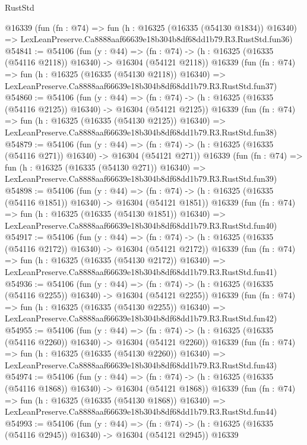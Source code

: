 \begin{lexlean}{RustStd}
\begin{coremodule}
    @16339
    (fun (fn : @74) =>
    fun (h : @16325 (@16335 (@54130 @1834)) @16340) =>
    LexLeanPreserve.Ca8888aaf66639e18b304b8df68dd1b79.R3.RustStd.fun36)
@54841 := @54106
    (fun (y : @44) =>
    (fn : @74) -> (h : @16325 (@16335 (@54116 @2118)) @16340) -> @16304 (@54121 @2118))
    @16339
    (fun (fn : @74) =>
    fun (h : @16325 (@16335 (@54130 @2118)) @16340) =>
    LexLeanPreserve.Ca8888aaf66639e18b304b8df68dd1b79.R3.RustStd.fun37)
@54860 := @54106
    (fun (y : @44) =>
    (fn : @74) -> (h : @16325 (@16335 (@54116 @2125)) @16340) -> @16304 (@54121 @2125))
    @16339
    (fun (fn : @74) =>
    fun (h : @16325 (@16335 (@54130 @2125)) @16340) =>
    LexLeanPreserve.Ca8888aaf66639e18b304b8df68dd1b79.R3.RustStd.fun38)
@54879 := @54106
    (fun (y : @44) =>
    (fn : @74) -> (h : @16325 (@16335 (@54116 @271)) @16340) -> @16304 (@54121 @271))
    @16339
    (fun (fn : @74) =>
    fun (h : @16325 (@16335 (@54130 @271)) @16340) =>
    LexLeanPreserve.Ca8888aaf66639e18b304b8df68dd1b79.R3.RustStd.fun39)
@54898 := @54106
    (fun (y : @44) =>
    (fn : @74) -> (h : @16325 (@16335 (@54116 @1851)) @16340) -> @16304 (@54121 @1851))
    @16339
    (fun (fn : @74) =>
    fun (h : @16325 (@16335 (@54130 @1851)) @16340) =>
    LexLeanPreserve.Ca8888aaf66639e18b304b8df68dd1b79.R3.RustStd.fun40)
@54917 := @54106
    (fun (y : @44) =>
    (fn : @74) -> (h : @16325 (@16335 (@54116 @2172)) @16340) -> @16304 (@54121 @2172))
    @16339
    (fun (fn : @74) =>
    fun (h : @16325 (@16335 (@54130 @2172)) @16340) =>
    LexLeanPreserve.Ca8888aaf66639e18b304b8df68dd1b79.R3.RustStd.fun41)
@54936 := @54106
    (fun (y : @44) =>
    (fn : @74) -> (h : @16325 (@16335 (@54116 @2255)) @16340) -> @16304 (@54121 @2255))
    @16339
    (fun (fn : @74) =>
    fun (h : @16325 (@16335 (@54130 @2255)) @16340) =>
    LexLeanPreserve.Ca8888aaf66639e18b304b8df68dd1b79.R3.RustStd.fun42)
@54955 := @54106
    (fun (y : @44) =>
    (fn : @74) -> (h : @16325 (@16335 (@54116 @2260)) @16340) -> @16304 (@54121 @2260))
    @16339
    (fun (fn : @74) =>
    fun (h : @16325 (@16335 (@54130 @2260)) @16340) =>
    LexLeanPreserve.Ca8888aaf66639e18b304b8df68dd1b79.R3.RustStd.fun43)
@54974 := @54106
    (fun (y : @44) =>
    (fn : @74) -> (h : @16325 (@16335 (@54116 @1868)) @16340) -> @16304 (@54121 @1868))
    @16339
    (fun (fn : @74) =>
    fun (h : @16325 (@16335 (@54130 @1868)) @16340) =>
    LexLeanPreserve.Ca8888aaf66639e18b304b8df68dd1b79.R3.RustStd.fun44)
@54993 := @54106
    (fun (y : @44) =>
    (fn : @74) -> (h : @16325 (@16335 (@54116 @2945)) @16340) -> @16304 (@54121 @2945))
    @16339

\end{coremodule}
\end{lexlean}
